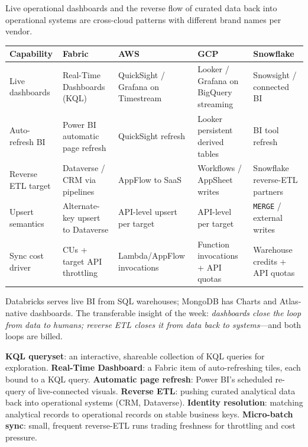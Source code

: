 \begin{crosscloud}
Live operational dashboards and the reverse flow of curated data back into operational systems are cross-cloud patterns with different brand names per vendor.

\vspace{2mm}
{\footnotesize
\begin{tabular}{@{}p{2.8cm}p{3.2cm}p{3.2cm}p{3.2cm}p{3.2cm}@{}}
\toprule
\textbf{Capability} & \textbf{Fabric} & \textbf{AWS} & \textbf{GCP} & \textbf{Snowflake} \\
\midrule
Live dashboards & Real-Time Dashboards (KQL) & QuickSight / Grafana on Timestream & Looker / Grafana on BigQuery streaming & Snowsight / connected BI \\
Auto-refresh BI & Power BI automatic page refresh & QuickSight refresh & Looker persistent derived tables & BI tool refresh \\
Reverse ETL target & Dataverse / CRM via pipelines & AppFlow to SaaS & Workflows / AppSheet writes & Snowflake reverse-ETL partners \\
Upsert semantics & Alternate-key upsert to Dataverse & API-level upsert per target & API-level per target & \texttt{MERGE} / external writes \\
Sync cost driver & CUs + target API throttling & Lambda/AppFlow invocations & Function invocations + API quotas & Warehouse credits + API quotas \\
\bottomrule
\end{tabular}}

\vspace{1mm}
Databricks serves live BI from SQL warehouses; MongoDB has Charts and Atlas-native dashboards. The transferable insight of the week: \emph{dashboards close the loop from data to humans; reverse ETL closes it from data back to systems}---and both loops are billed.
\end{crosscloud}

\begin{keyterms}
\textbf{KQL queryset}: an interactive, shareable collection of KQL queries for exploration. \quad
\textbf{Real-Time Dashboard}: a Fabric item of auto-refreshing tiles, each bound to a KQL query. \quad
\textbf{Automatic page refresh}: Power BI's scheduled re-query of live-connected visuals. \quad
\textbf{Reverse ETL}: pushing curated analytical data back into operational systems (CRM, Dataverse). \quad
\textbf{Identity resolution}: matching analytical records to operational records on stable business keys. \quad
\textbf{Micro-batch sync}: small, frequent reverse-ETL runs trading freshness for throttling and cost pressure.
\end{keyterms}

